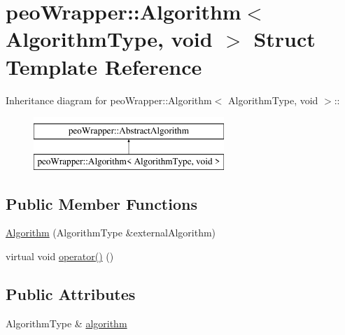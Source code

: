 \hypertarget{structpeoWrapper_1_1Algorithm_3_01AlgorithmType_00_01void_01_4}{
\section{peo\-Wrapper::Algorithm$<$ Algorithm\-Type, void $>$ Struct Template Reference}
\label{structpeoWrapper_1_1Algorithm_3_01AlgorithmType_00_01void_01_4}
}
Inheritance diagram for peo\-Wrapper::Algorithm$<$ Algorithm\-Type, void $>$::\begin{figure}[H]
\begin{center}
\leavevmode
\includegraphics[height=2cm]{structpeoWrapper_1_1Algorithm_3_01AlgorithmType_00_01void_01_4}
\end{center}
\end{figure}
\subsection*{Public Member Functions}
\begin{CompactItemize}
\item 
\hypertarget{structpeoWrapper_1_1Algorithm_3_01AlgorithmType_00_01void_01_4_a1223438f15e954880a0a9833890dd91}{
\hyperlink{structpeoWrapper_1_1Algorithm_3_01AlgorithmType_00_01void_01_4_a1223438f15e954880a0a9833890dd91}{Algorithm} (Algorithm\-Type \&external\-Algorithm)}
\label{structpeoWrapper_1_1Algorithm_3_01AlgorithmType_00_01void_01_4_a1223438f15e954880a0a9833890dd91}

\item 
\hypertarget{structpeoWrapper_1_1Algorithm_3_01AlgorithmType_00_01void_01_4_c6fe207372bb3b53c7ccecf6d596c4e5}{
virtual void \hyperlink{structpeoWrapper_1_1Algorithm_3_01AlgorithmType_00_01void_01_4_c6fe207372bb3b53c7ccecf6d596c4e5}{operator()} ()}
\label{structpeoWrapper_1_1Algorithm_3_01AlgorithmType_00_01void_01_4_c6fe207372bb3b53c7ccecf6d596c4e5}

\end{CompactItemize}
\subsection*{Public Attributes}
\begin{CompactItemize}
\item 
\hypertarget{structpeoWrapper_1_1Algorithm_3_01AlgorithmType_00_01void_01_4_9be62964456f157d5cef10710905a314}{
Algorithm\-Type \& \hyperlink{structpeoWrapper_1_1Algorithm_3_01AlgorithmType_00_01void_01_4_9be62964456f157d5cef10710905a314}{algorithm}}
\label{structpeoWrapper_1_1Algorithm_3_01AlgorithmType_00_01void_01_4_9be62964456f157d5cef10710905a314}

\end{CompactItemize}


